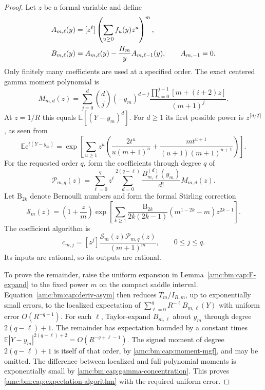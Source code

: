 \documentclass[11pt,letterpaper]{article}
\theoremstyle{remark}\newtheorem{remark}[theorem]{Remark}
\newcommand{\ee}{\mathrm e}
\begin{document}
\begin{proof}
Let $z$ be a formal variable and define
\begin{align}
 A_{m,\ell}(y)&=[z^\ell]\left(\sum_{u\ge0}f_u(y)z^u\right)^m,\notag\\
 B_{m,\ell}(y)&=A_{m,\ell}(y)-\frac{H_m}{y}A_{m,\ell-1}(y),
 \qquad A_{m,-1}=0.\label{amc:bm:cap:AB}
\end{align}
Only finitely many coefficients are used at a specified order. The exact centered gamma moment polynomial is
\begin{equation}\label{amc:bm:cap:moment-poly}
 M_{m,d}(z)=\sum_{j=0}^d\binom dj(-y_m)^{d-j}
 \frac{\prod_{i=0}^{j-1}[m+(i+2)z]}{(m+1)^j}.
\end{equation}
At $z=1/R$ this equals $\mathbb E[(Y-y_m)^d]$. For $d\ge1$ its first possible power is $z^{\lceil d/2\rceil}$, as seen from
\begin{equation}\label{amc:bm:cap:moment-mgf}
 \mathbb E\ee^{t(Y-y_m)}
 =\exp\left[\sum_{u\ge1}z^u
 \left(\frac{2t^u}{u(m+1)^u}
 +\frac{mt^{u+1}}{(u+1)(m+1)^{u+1}}\right)\right].
\end{equation}
For the requested order $q$, form the coefficients through degree $q$ of
\begin{equation}\label{amc:bm:cap:expectation-algorithm}
 \mathcal P_{m,q}(z)=\sum_{\ell=0}^q z^\ell
 \sum_{d=0}^{2(q-\ell)}
 \frac{B_{m,\ell}^{(d)}(y_m)}{d!}M_{m,d}(z).
\end{equation}
Let $\mathrm B_{2k}$ denote Bernoulli numbers and form the formal Stirling correction
\begin{equation}\label{amc:bm:cap:stirling-series}
 \mathcal S_m(z)=\left(1+\frac zm\right)
 \exp\left[\sum_{k\ge1}\frac{\mathrm B_{2k}}{2k(2k-1)}
 (m^{1-2k}-m)z^{2k-1}\right].
\end{equation}
The coefficient algorithm is
\begin{equation}\label{amc:bm:cap:coefficient-algorithm}
 c_{m,j}=[z^j]\frac{\mathcal S_m(z)\mathcal P_{m,q}(z)}{(m+1)^m},
 \qquad 0\le j\le q.
\end{equation}
Its inputs are rational, so its outputs are rational.

To prove the remainder, raise the uniform expansion in Lemma~\ref{amc:bm:cap:F-expand} to the fixed power $m$ on the compact saddle interval. Equation~\eqref{amc:bm:cap:deriv-asym} then reduces $T_m/I_{R,m}$, up to exponentially small errors, to the localized expectation of
$\sum_{\ell=0}^qR^{-\ell}B_{m,\ell}(Y)$ with uniform error $O(R^{-q-1})$.
For each $\ell$, Taylor-expand $B_{m,\ell}$ about $y_m$ through degree $2(q-\ell)+1$. The remainder has expectation bounded by a constant times
$\mathbb E|Y-y_m|^{2(q-\ell)+2}=O(R^{-q+\ell-1})$.
The signed moment of degree $2(q-\ell)+1$ is itself of that order, by \eqref{amc:bm:cap:moment-mgf}, and may be omitted. The difference between localized and full polynomial moments is exponentially small by \eqref{amc:bm:cap:gamma-concentration}. This proves \eqref{amc:bm:cap:expectation-algorithm} with the required uniform error.


\end{proof}
\end{document}
